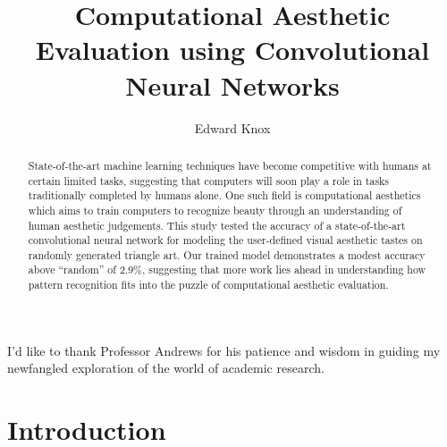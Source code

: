 \documentclass[midd]{thesis}
\title {Computational Aesthetic Evaluation using Convolutional Neural Networks}
\author {Edward Knox}
\begin{document}
\maketitle









\begin{abstract}
State-of-the-art machine learning techniques have become competitive with humans at certain limited tasks, suggesting that computers will soon play a role in tasks traditionally completed by humans alone. One such field is computational aesthetics which aims to train computers to recognize beauty through an understanding of human aesthetic judgements. This study tested the accuracy of a state-of-the-art convolutional neural network for modeling the user-defined visual aesthetic tastes on randomly generated triangle art. Our trained model demonstrates a modest accuracy above ``random'' of 2.9\%, suggesting that more work lies ahead in understanding how pattern recognition fits into the puzzle of computational aesthetic evaluation.
\end{abstract}

\begin{acknowledgements}
I'd like to thank Professor Andrews for his patience and wisdom in guiding my newfangled exploration of the world of academic research. 
\end{acknowledgements}

\contentspage
\tablelistpage
\figurelistpage

\normalspacing \setcounter{page}{1} 
















\chapter{Introduction}
\label{sec:intro}


\end{document}
